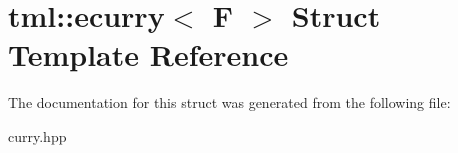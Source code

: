 \hypertarget{structtml_1_1ecurry}{\section{tml\+:\+:ecurry$<$ F $>$ Struct Template Reference}
\label{structtml_1_1ecurry}
}


The documentation for this struct was generated from the following file\+:\begin{DoxyCompactItemize}
\item 
curry.\+hpp\end{DoxyCompactItemize}
